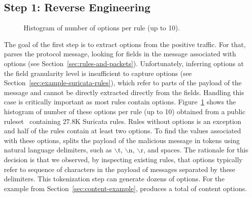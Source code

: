 \documentclass[sigconf,anonymous]{acmart}
\begin{document}
\subsection{Step 1: Reverse Engineering}




\pgfplotsset{width=6cm,compat=1.8}

\begin{figure}[t!]
  \centering
  \caption{\label{fig:distribution-contents}Histogram of number of
     options per rule (up to 10).}
\end{figure}  



The goal of the first step is to extract options from the positive
traffic. For that, \tname{} parses the protocol message, looking for
fields in the message associated with options (see
Section~\ref{sec:rules-and-packets}).
Unfortunately, inferring options at the field granularity
level is insufficient to capture  options (see
Section~\ref{sec:example-suricata-rules}), which refer to parts of the
payload of the message and cannot be directly extracted directly from
the fields. Handling this case is critically important as most rules
contain 
options. Figure~\ref{fig:distribution-contents} shows the histogram of
number of these options per rule (up to 10) obtained from a public
ruleset~\cite{emerging-threats-open} containing 27.8K Suricata
rules. Rules without  options is an exception and half
of the rules contain at least two  options.  To find
the values associated with these options, \tname{} splits the payload
of the malicious message in tokens using natural language delimiters,
such as $\backslash$t, $\backslash$n, $\backslash$r, and spaces. The
rationale for this decision is that we observed, by inspecting
existing rules, that  options typically refer to
sequence of characters in the payload of messages separated by these
delimiters. This tokenization step can generate dozens of options. For
the example from Section~\ref{sec:content-example}, \tname{} produces
a total of  content options.
\end{document}
